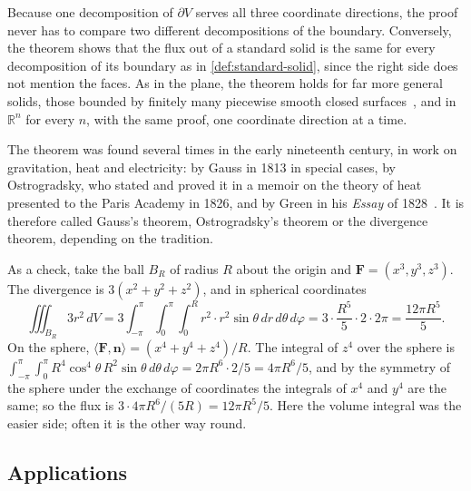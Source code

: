 Because one decomposition of $\partial V$ serves all three coordinate directions, the proof never has to compare two different decompositions of the boundary. Conversely, the theorem shows that the flux out of a standard solid is the same for every decomposition of its boundary as in \cref{def:standard-solid}, since the right side does not mention the faces. As in the plane, the theorem holds for far more general solids, those bounded by finitely many piecewise smooth closed surfaces~\cite{apostol1969calculus,marsden2012vector}, and in $\mathbb R^n$ for every $n$, with the same proof, one coordinate direction at a time.

The theorem was found several times in the early nineteenth century, in work on gravitation, heat and electricity: by Gauss in 1813 in special cases, by Ostrogradsky, who stated and proved it in a memoir on the theory of heat presented to the Paris Academy in 1826, and by Green in his \emph{Essay} of 1828~\cite{green1828,katz1979}. It is therefore called Gauss's theorem, Ostrogradsky's theorem or the divergence theorem, depending on the tradition.

As a check, take the ball $B_R$ of radius $R$ about the origin and $\mathbf F=(x^3,y^3,z^3)$. The divergence is $3(x^2+y^2+z^2)$, and in spherical coordinates
\[
\iiint_{B_R}3r^2\,dV=3\int_{-\pi}^\pi\int_0^\pi\int_0^Rr^2\cdot r^2\sin\theta\,dr\,d\theta\,d\varphi=3\cdot\frac{R^5}5\cdot2\cdot2\pi=\frac{12\pi R^5}5 .
\]
On the sphere, $\langle\mathbf F,\mathbf n\rangle=(x^4+y^4+z^4)/R$. The integral of $z^4$ over the sphere is $\int_{-\pi}^\pi\int_0^\pi R^4\cos^4\theta\,R^2\sin\theta\,d\theta\,d\varphi=2\pi R^6\cdot2/5=4\pi R^6/5$, and by the symmetry of the sphere under the exchange of coordinates the integrals of $x^4$ and $y^4$ are the same; so the flux is $3\cdot4\pi R^6/(5R)=12\pi R^5/5$. Here the volume integral was the easier side; often it is the other way round.

\subsection{Applications}

